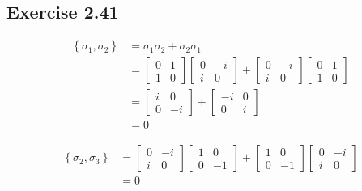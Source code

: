 \documentclass[a4paper,12pt]{article}
\begin{document}
\subsection*{Exercise 2.41}
\begin{align*}
\left\{\sigma_1, \sigma_2 \right\} &=\sigma_1 \sigma_2 + \sigma_2 \sigma_1\\
&= \begin{bmatrix}
0 & 1 \\
1 & 0
\end{bmatrix}
\begin{bmatrix}
0 & -i \\
i & 0
\end{bmatrix}
+
\begin{bmatrix}
0 & -i \\
i & 0
\end{bmatrix}
\begin{bmatrix}
0 & 1 \\
1 & 0
\end{bmatrix} \\
%
&=
%
\begin{bmatrix}
i & 0 \\
0 & -i
\end{bmatrix}
+
\begin{bmatrix}
-i & 0 \\
0 & i
\end{bmatrix}\\
%
&= 0
\end{align*}



\begin{align*}
\left\{\sigma_2, \sigma_3 \right\} &= \begin{bmatrix}
0 & -i \\
i & 0
\end{bmatrix}
\begin{bmatrix}
1 & 0 \\
0 & -1
\end{bmatrix}
+
\begin{bmatrix}
1 & 0 \\
0 & -1
\end{bmatrix}
\begin{bmatrix}
0 & -i \\
i & 0
\end{bmatrix}\\
&=0
\end{align*}
\end{document}
